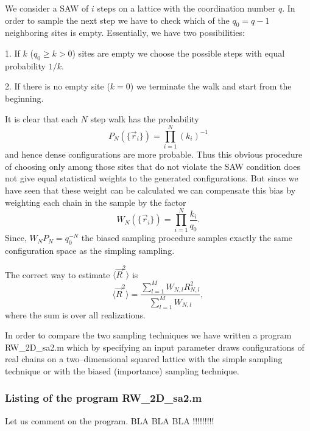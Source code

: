 We consider a SAW of $i$ steps on a lattice with the coordination 
number $q$. In order to sample the next step we have to check  
which of the $q_0 = q-1$ neighboring sites is empty. Essentially,
we have two possibilities:

1. If $k$ ($q_0 \ge k >0$) sites are empty we choose the possible 
steps with equal probability $1/k$.

2. If there is no empty site ($k=0$) we terminate the walk and 
start from the beginning.

It is clear that each $N$ step walk has the probability
\begin{equation*}
P_N(\{ \vec{r}_i \}) = \prod_{i=1}^N (k_i)^{-1}
\end{equation*}
and hence dense configurations are more probable. Thus this 
obvious procedure of choosing only among those  sites that do not 
violate the SAW condition does not give equal statistical weights
to the generated configurations. But since we have seen that these 
weight can be calculated we can compensate this bias by weighting 
each chain in the sample by the factor
\begin{equation*}
W_N(\{ \vec{r}_i \}) =  \prod_{i=1}^N \frac{k_i}{q_0}.
\end{equation*}
Since, $W_N P_N = q_0^{-N}$ the biased sampling procedure samples 
exactly the same configuration space as the simpling sampling.

The correct way to estimate $\langle \vec{R}^2 \rangle$ is
\begin{equation*}
\langle \vec{R}^2 \rangle = \frac{\sum_{l=1}^M W_{N,l} R^2_{N,l}}
                               {\sum_{l=1}^M W_{N,l}},
\end{equation*}
where the sum is over all realizations.

In order to compare the two sampling techniques we have written a 
program {\sf RW\_2D\_sa2.m} which by specifying an input parameter
draws configurations of real chains on a two--dimensional squared lattice 
with the simple sampling 
technique or with the biased (importance) sampling technique.



\subsubsection{Listing of the program {\sf RW\_2D\_sa2.m}}

Let us comment on the program. BLA BLA BLA !!!!!!!!!

